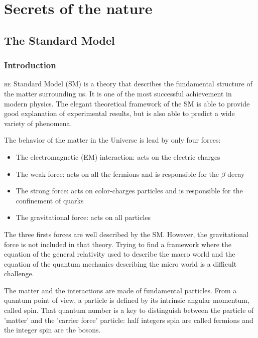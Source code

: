 \chapter{Secrets of the nature}

  \section{The Standard Model}

    \subsection{Introduction}
    
    \lettrine{}{he} Standard Model (SM) is a theory that describes the fundamental structure of the matter surrounding us. 
    It is one of the most successful achievement in modern physics.
    The elegant theoretical framework of the SM is able to provide good explanation of experimental results, but is also able to predict a wide variety of phenomena.

    The behavior of the matter in the Universe is lead by only four forces:
   \begin{center} 
    \begin{itemize}
        \item The electromagnetic (EM) interaction: acts on the electric charges
        \item The weak force: acts on all the fermions and is responsible for the $\beta$ decay
        \item The strong force: acts on color-charges particles and is responsible for the confinement of quarks
        \item The gravitational force: acts on all particles
    \end{itemize}
    \end{center}

    The three firsts forces are well described by the SM.
    However, the gravitational force is not included in that theory. 
    Trying to find a framework where the equation of the general relativity used to describe the macro world and the equation of the quantum mechanics describing the micro world is a difficult challenge.
    
    The matter and the interactions are made of fundamental particles.
    From a quantum point of view, a particle is defined by its intrinsic angular momentum, called spin. 
    That quantum number is a key to distinguish between the particle of 'matter' and the 'carrier force' particle: half integers spin are called fermions and the integer spin are the bosons.

